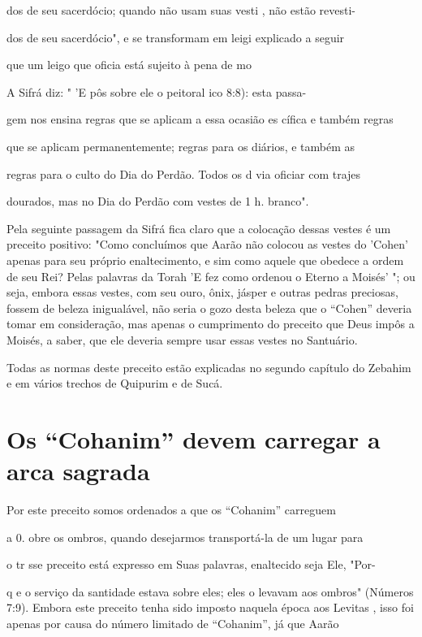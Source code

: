 dos de seu sacerdócio; quando não usam suas vesti , não estão revesti-

dos de seu sacerdócio", e se transformam em leigi explicado a seguir

que um leigo que oficia está sujeito à pena de mo

A Sifrá diz: " 'E pôs sobre ele o peitoral ico 8:8): esta passa-


gem nos ensina regras que se aplicam a essa ocasião es cífica e também
regras


que se aplicam permanentemente; regras para os diários, e também as

regras para o culto do Dia do Perdão. Todos os d via oficiar com trajes

dourados, mas no Dia do Perdão com vestes de 1 h. branco".

Pela seguinte passagem da Sifrá fica claro que a colocação dessas
ves­tes é um preceito positivo: "Como concluímos que Aarão não colocou
as ves­tes do 'Cohen' apenas para seu próprio enaltecimento, e sim como
aquele que obedece a ordem de seu Rei? Pelas palavras da Torah 'E fez
como ordenou o Eterno a Moisés' "; ou seja, embora essas vestes, com seu
ouro, ônix, jásper e outras pedras preciosas, fossem de beleza
inigualável, não seria o gozo desta beleza que o ``Cohen'' deveria tomar
em consideração, mas apenas o cumpri­mento do preceito que Deus impôs a
Moisés, a saber, que ele deveria sempre usar essas vestes no Santuário.

Todas as normas deste preceito estão explicadas no segundo capítu­lo do
Zebahim e em vários trechos de Quipurim e de Sucá.

\section{Os ``Cohanim'' devem carregar a arca sagrada}



Por este preceito somos ordenados a que os ``Cohanim'' carreguem


a 0. obre os ombros, quando desejarmos transportá-la
de um lugar para

o tr sse preceito está expresso em Suas palavras, enaltecido seja Ele,
"Por-


q e o serviço da santidade estava sobre eles; eles o levavam aos ombros"
(Números
7:9). Embora este preceito tenha sido imposto naquela época aos
Levitas
, isso foi apenas por causa do número limitado de ``Cohanim'', já que
Aarão


